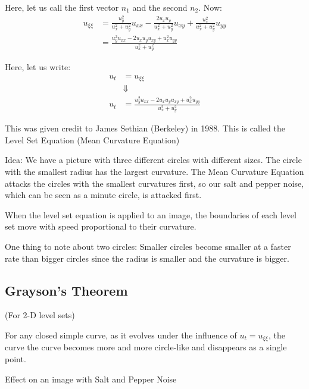 Here, let us call the first vector $n_1$ and the second $n_2$. Now:
%
\begin{align}
  u_{\xi \xi} & = \frac{u^2_y}{u^2_x + u^2_y} u_{xx} - \frac{2 u_x u_y}{u^2_x + u^2_y} u_{xy} + \frac{u^2_x}{u^2_x + u^2_y} u_{yy}\\
  & = \frac{u^2_y u_{xx} - 2u_x u_y u_{xy} + u^2_x u_{yy}}{u^2_x + u^2_y}
\end{align}

Here, let us write:
%
\begin{align}
  u_t & = u_{\xi\xi}\\
  & \Downarrow\\
  u_t & = \frac{u^2_y u_{xx} - 2u_x u_y u_{xy} + u^2_x u_{yy}}{u^2_x + u^2_y}
\end{align}

This was given credit to James Sethian (Berkeley) in 1988. This is called the Level Set Equation (Mean Curvature Equation)

Idea: We have a picture with three different circles with different sizes. The circle with the smallest radius has the largest curvature. The Mean Curvature Equation attacks the circles with the smallest curvatures first, so our salt and pepper noise, which can be seen as a minute circle, is attacked first.

When the level set equation is applied to an image, the boundaries of each level set move with speed proportional to their curvature.

One thing to note about two circles: Smaller circles become smaller at a faster rate than bigger circles since the radius is smaller and the curvature is bigger.

\subsection{Grayson's Theorem} (For 2-D level sets)

For any closed simple curve, as it evolves under the influence of $u_t = u_{\xi \xi}$, the curve the curve becomes more and more circle-like and disappears as a single point.



Effect on an image with Salt and Pepper Noise


